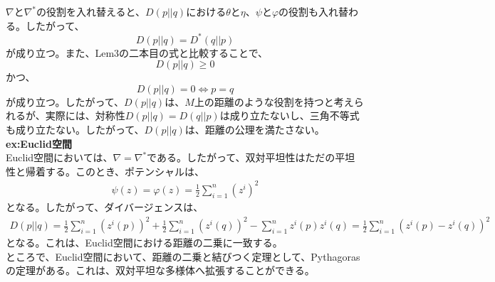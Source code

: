\documentclass[a4paper,11pt]{jsarticle}
\numberwithin{equation}{section}
\begin{document}
    $\nabla$と$\nabla^*$の役割を入れ替えると、$D(p||q)$における$\theta$と$\eta$、$\psi$と$\varphi$の役割も入れ替わる。したがって、
    \begin{equation}
        D(p||q) = D^*(q||p)
    \end{equation}
    が成り立つ。また、Lem3の二本目の式と比較することで、
    \begin{equation}
        D(p||q) \geq 0
    \end{equation}
    かつ、
    \begin{equation}
        D(p||q) = 0 \Leftrightarrow p = q
    \end{equation}
    が成り立つ。したがって、$D(p||q)$は、$M$上の距離のような役割を持つと考えられるが、実際には、対称性$D(p||q) = D(q||p)$は成り立たないし、三角不等式も成り立たない。したがって、$D(p||q)$は、距離の公理を満たさない。\\
    
    \textbf{ex:Euclid空間}\\
    Euclid空間においては、$\nabla = \nabla^*$である。したがって、双対平坦性はただの平坦性と帰着する。このとき、ポテンシャルは、
    \begin{align}
        \psi(z) = \varphi(z) = \frac{1}{2}\sum_{i=1}^{n} (z^i)^2
    \end{align}
    となる。したがって、ダイバージェンスは、
    \begin{align}
        D(p||q) = \frac{1}{2}\sum_{i=1}^{n} (z^i(p))^2 + \frac{1}{2}\sum_{i=1}^{n} (z^i(q))^2 - \sum_{i=1}^{n} z^i(p)z^i(q) = \frac{1}{2}\sum_{i=1}^{n} (z^i(p) - z^i(q))^2
    \end{align}
    となる。これは、Euclid空間における距離の二乗に一致する。\\
    ところで、Euclid空間において、距離の二乗と結びつく定理として、Pythagorasの定理がある。これは、双対平坦な多様体へ拡張することができる。
    
\end{document}
